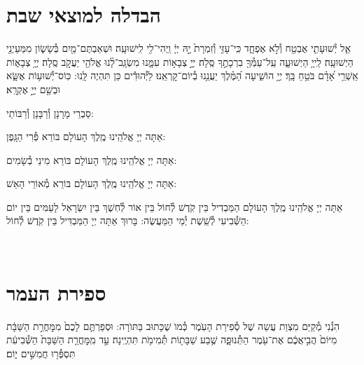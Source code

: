 \documentclass[twoside, openany, parskip=half, 11pt]{book}
\begin{document}
\section[הבדלה]{ הבדלה למוצאי שבת } \label{havdala}

אֵ֧ל יְ֯שׁוּעָתִ֛י אֶבְטַ֖ח וְ֯לֹ֣א אֶפְחָ֑ד כִּֽי־עָזִּ֤י וְ֯זִמְרָת֙ יָ֣הּ יְיָ֔ וַֽיְהִי־לִ֖י לִֽישׁוּעָֽה׃
וּשְׁאַבְתֶּם־מַ֖יִם בְּ֯שָׂשׂ֑וֹן מִמַּעַיְנֵ֖י הַיְשׁוּעָֽה׃
לַֽייָ֥ הַיְשׁוּעָ֑ה עַֽל־עַמְּ֯ךָ֖ בִרְכָתֶ֣ךָ סֶּֽלָה׃
יְיָ֣ צְבָא֣וֹת עִמָּ֑נוּ מִשְׂגָּֽב־לָ֨נוּ אֱלֹהֵ֖י יַעֲקֹ֣ב סֶֽלָה׃
יְיָ֥ צְבָא֑וֹת אַֽשְׁרֵ֥י אָ֝דָ֗ם בֹּטֵ֥חַ בָּֽךְ׃
יְיָ֥ הוֹשִׁ֑יעָה הַ֝מֶּ֗לֶךְ יַעֲנֵ֥נוּ בְ֯יוֹם־קׇרְאֵֽנוּ׃
לַיְּ֯הוּדִ֕ים  כֵּן תִּהְיֶה לָּֽנוּ: כּֽוֹס־יְ֯שׁוּע֥וֹת אֶשָּׂ֑א וּבְשֵׁ֖ם יְיָ֣ אֶקְרָֽא׃

\begin{scriptsize}
סַבְרֵי מָרָנָן וְ֯רַבָּנָן וְ֯רַבּוֹתַי: \\
\end{scriptsize}
אַתָּה יְיָ אֱלֹהֵֽינוּ מֶֽלֶךְ הָעוֹלָם בּוֹרֵא פְּ֯רִי הַגָּֽפֶן:

אַתָּה יְיָ אֱלֹהֵֽינוּ מֶֽלֶךְ הָעוֹלָם בּוֹרֵא מִינֵי בְ֯שָׂמִים:

אַתָּה יְיָ אֱלֹהֵֽינוּ מֶֽלֶךְ הָעוֹלָם בּוֹרֵא מְ֯אוֹרֵי הָאֵשׁ:

אַתָּה יְיָ אֱלֹהֵֽינוּ מֶֽלֶךְ הָעוֹלָם הַמַּבְדִיל בֵּין קֹֽדֶשׁ לְ֯חוֹל בֵּין אוֹר לְ֯חֽשֶׁךְ בֵּין יִשְׂרָאֵל לָעַמִּים בֵּין יוֹם הַשְּׁ֯בִיעִי לְ֯שֵֽׁשֶׁת יְ֯מֵי הַמַּעֲשֶׂה: בָּרוּךְ אַתָּה יְיָ הַמַּבְדִּיל בֵּין קֹֽדֶשׁ לְ֯חוֹל:
\clearpage

\vspace{-1.3\baselineskip}










\quad{}\quad{}\\

\section{ספירת העמר}
\label{sefiras haomer}

הִנְ֯נִי מְ֯קַיֵּם מִצְוַת עֲשֵה שֶׁל סְ֯פִירַת הָעֽׂמֶר כְּ֯מוׂ שֶׁכָּתוּב בַּתּוׂרָה: וּסְפַרְתֶּ֤ם לָכֶם֙ מִמׇּחֳרַ֣ת הַשַּׁבָּ֔ת מִיּוֹם֙ הֲבִ֣יאֲכֶ֔ם אֶת־עֹ֖מֶר הַתְּ֯נוּפָ֑ה שֶׁ֥בַע שַׁבָּת֖וֹת תְּ֯מִימֹ֥ת תִּהְיֶֽינָה׃ עַ֣ד מִֽמׇּחֳרַ֤ת הַשַּׁבָּת֙ הַשְּׁ֯בִיעִ֔ת תִּסְפְּ֯ר֖וּ חֲמִשִּׁ֣ים י֑וֹם׃
\end{document}
